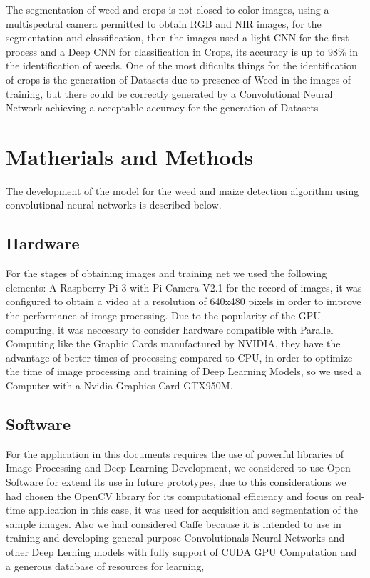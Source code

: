 \documentclass[conference]{IEEEtran}
\begin{document}
The segmentation of weed and crops is not closed to color images, using a multispectral camera  \cite{Potena:Nardi} permitted to obtain RGB and NIR images, for the segmentation and classification, then the images used a light CNN for the first process and a Deep CNN for classification in Crops, its accuracy is up to 98\% in the identification of weeds. One of the most dificults things for the identification of crops is the generation of Datasets due to presence of Weed in the images of training, but there could be correctly generated by a Convolutional Neural Network \cite{Cicco:Potena} achieving a acceptable accuracy for the generation of Datasets 
\\

\section{Matherials and Methods}
The development of the model for the weed and maize detection algorithm using convolutional neural networks is described below.
\\
\subsection{Hardware}
For the stages of obtaining images and training net we  used the following elements: A Raspberry Pi 3 with Pi Camera V2.1 for the record of images, it was configured to obtain a video at a resolution of 640x480 pixels in order to improve the performance of image processing. Due to the popularity of the GPU computing, it was neccesary to consider hardware compatible with Parallel Computing like the Graphic Cards manufactured by NVIDIA, they have the advantage of better times of processing compared to CPU, in order to optimize the time of image processing and training of Deep Learning Models, so we used a Computer with a Nvidia Graphics Card GTX950M.
\\

\subsection{Software}

For the application in this documents requires the use of powerful libraries of Image Processing and Deep Learning Development, we considered to use Open Software for extend its use  in future prototypes, due to this considerations we had chosen the OpenCV library for its computational efficiency and focus on real-time application \cite{OpenCV} in this  case, it was used for acquisition and segmentation of the sample images. Also we had considered Caffe because it is intended to use in training and developing general-purpose Convolutionals Neural Networks and other Deep Lerning models \cite{caffe} with fully support of CUDA GPU Computation and a generous database of resources for learning,	
\\
\end{document}
